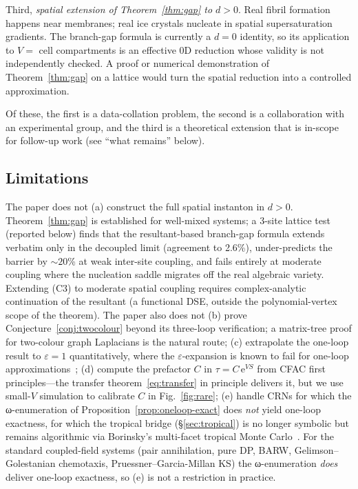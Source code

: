 \documentclass[11pt,a4paper]{article}
\newcommand{\ee}{\mathrm{e}}
\theoremstyle{plain}
\begin{document}
Third, \emph{spatial extension of Theorem~\ref{thm:gap} to $d > 0$}.
Real fibril formation happens near membranes; real ice crystals
nucleate in spatial supersaturation gradients.  The branch-gap
formula is currently a $d = 0$ identity, so its application to
$V = $ cell compartments is an effective 0D reduction whose
validity is not independently checked.  A proof or numerical
demonstration of Theorem~\ref{thm:gap} on a lattice would turn
the spatial reduction into a controlled approximation.

Of these, the first is a data-collation problem, the second is a
collaboration with an experimental group, and the third is a
theoretical extension that is in-scope for follow-up work (see
``what remains'' below).

\subsection{Limitations}
\label{sec:limitations}

The paper does not (a) construct the full spatial instanton in
$d > 0$.  Theorem~\ref{thm:gap} is established for well-mixed
systems; a 3-site lattice test (reported below) finds that the
resultant-based branch-gap formula extends verbatim only in the
decoupled limit (agreement to 2.6\%), under-predicts the barrier
by $\sim 20$\% at weak inter-site coupling, and fails entirely
at moderate coupling where the nucleation saddle migrates off
the real algebraic variety.  Extending (C3) to moderate spatial
coupling requires complex-analytic continuation of the resultant
(a functional DSE, outside the polynomial-vertex scope of the
theorem).  The paper also does not (b) prove
Conjecture~\ref{conj:twocolour} beyond its three-loop
verification; a matrix-tree proof for two-colour graph Laplacians
is the natural route; (c) extrapolate the one-loop result to
$\varepsilon = 1$ quantitatively, where the $\varepsilon$-expansion
is known to fail for one-loop approximations~\cite{Tauber}; (d)
compute the prefactor $C$ in $\tau = C\,\ee^{VS}$ from CFAC
first principles---the transfer theorem~\eqref{eq:transfer} in
principle delivers it, but we use small-$V$ simulation to
calibrate $C$ in Fig.~\ref{fig:rare}; (e) handle CRNs for which
the ω-enumeration of Proposition~\ref{prop:oneloop-exact}
does \emph{not} yield one-loop exactness, for which the tropical
bridge (\S\ref{sec:tropical}) is no longer symbolic but remains
algorithmic via Borinsky's multi-facet tropical Monte
Carlo~\cite{Borinsky2020,Borinsky2025}.  For the standard
coupled-field systems (pair annihilation, pure DP, BARW,
Gelimson--Golestanian chemotaxis, Pruessner--Garcia-Millan KS)
the ω-enumeration \emph{does} deliver one-loop exactness, so
(e) is not a restriction in practice.
\end{document}
